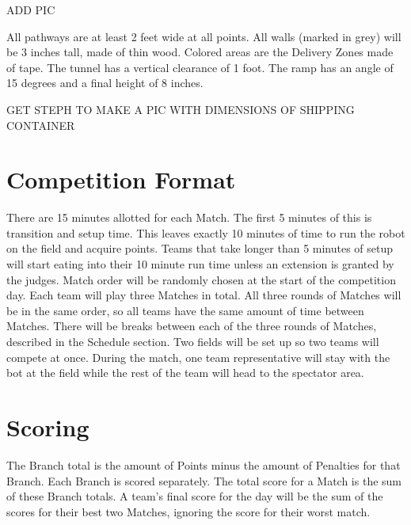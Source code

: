 \documentclass[a4paper,12pt]{article}
\begin{document}
ADD PIC \newline

\noindent
All pathways are at least 2 feet wide at all points. All walls (marked in grey) will be 3 inches tall, made of thin wood. Colored areas are the Delivery Zones made of tape. The tunnel has a vertical clearance of 1 foot. The ramp has an angle of 15 degrees and a final height of 8 inches. \newline

\noindent
GET STEPH TO MAKE A PIC WITH DIMENSIONS OF SHIPPING CONTAINER

\section{Competition Format}
There are 15 minutes allotted for each Match. The first 5 minutes of this is transition and setup time. This leaves exactly 10 minutes of time to run the robot on the field and acquire points. Teams that take longer than 5 minutes of setup will start eating into their 10 minute run time unless an extension is granted by the judges. Match order will be randomly chosen at the start of the competition day. Each team will play three Matches in total. All three rounds of Matches will be in the same order, so all teams have the same amount of time between Matches. There will be breaks between each of the three rounds of Matches, described in the Schedule section. Two fields will be set up so two teams will compete at once. During the match, one team representative will stay with the bot at the field while the rest of the team will head to the spectator area.


\section{Scoring}
The Branch total is the amount of Points minus the amount of Penalties for that Branch. Each Branch is scored separately. The total score for a Match is the sum of these Branch totals. A team’s final score for the day will be the sum of the scores for their best two Matches, ignoring the score for their worst match. 
\end{document}
